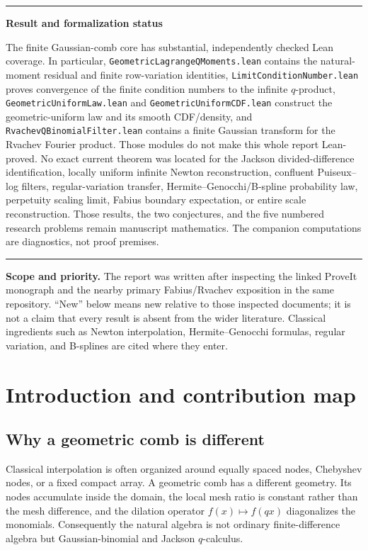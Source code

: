 \documentclass[11pt,oneside]{article}
\numberwithin{equation}{section}
\theoremstyle{definition}
\theoremstyle{remark}
\newenvironment{statusbox}[1]{%
  \par\smallskip\noindent\begin{center}\begin{minipage}{0.94\textwidth}%
  \color{black}\hrule\vspace{0.6em}\small\textbf{#1}\par\smallskip
}{%
  \vspace{0.6em}\hrule\end{minipage}\end{center}\smallskip
}
\begin{document}
\begin{statusbox}{Result and formalization status}
The finite Gaussian-comb core has substantial, independently checked Lean
coverage.  In particular,
\nolinkurl{GeometricLagrangeQMoments.lean} contains the natural-moment residual
and finite row-variation identities,
\nolinkurl{LimitConditionNumber.lean} proves convergence of the finite
condition numbers to the infinite $q$-product,
\nolinkurl{GeometricUniformLaw.lean} and
\nolinkurl{GeometricUniformCDF.lean} construct the geometric-uniform law and
its smooth CDF/density, and \nolinkurl{RvachevQBinomialFilter.lean} contains a
finite Gaussian transform for the Rvachev Fourier product.  Those modules do
not make this whole report Lean-proved.  No exact current theorem was located
for the Jackson divided-difference identification, locally uniform infinite
Newton reconstruction, confluent Puiseux--log filters, regular-variation
transfer, Hermite--Genocchi/B-spline probability law, perpetuity scaling limit,
Fabius boundary expectation, or entire scale reconstruction.  Those results,
the two conjectures, and the five numbered research problems remain manuscript
mathematics.  The companion computations are diagnostics, not proof premises.
\end{statusbox}

\vspace{0.5em}
\noindent\textbf{Scope and priority.}
The report was written after inspecting the linked ProveIt monograph and the
nearby primary Fabius/Rvachev exposition in the same repository.  ``New'' below
means new relative to those inspected documents; it is not a claim that every
result is absent from the wider literature.  Classical ingredients such as
Newton interpolation, Hermite--Genocchi formulas, regular variation, and
B-splines are cited where they enter.

\tableofcontents
\newpage

\section{Introduction and contribution map}

\subsection{Why a geometric comb is different}

Classical interpolation is often organized around equally spaced nodes,
Chebyshev nodes, or a fixed compact array.  A geometric comb has a different
geometry.  Its nodes accumulate inside the domain, the local mesh ratio is
constant rather than the mesh difference, and the dilation operator
$f(x)\mapsto f(qx)$ diagonalizes the monomials.  Consequently the natural
algebra is not ordinary finite-difference algebra but Gaussian-binomial and
Jackson $q$-calculus.
\end{document}
